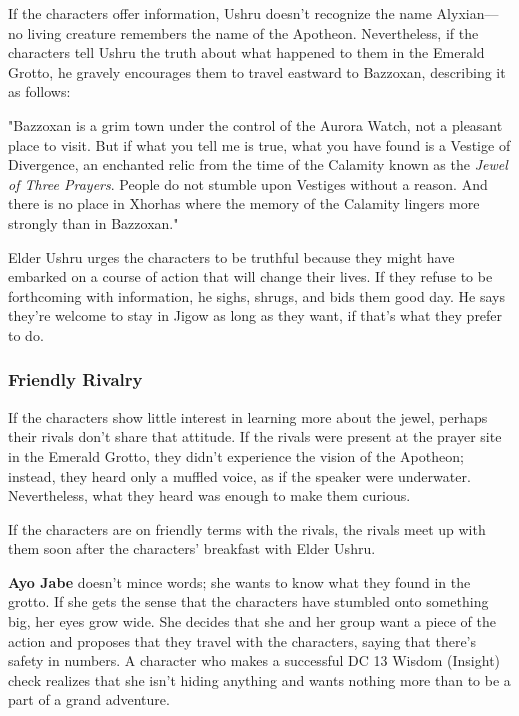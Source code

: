 \documentclass[a4paper, 11pt, bg=full, twocolumn, nooutline]{dndbook}
\begin{document}
If the characters offer information, Ushru doesn't recognize the name Alyxian---no living creature remembers the name of the Apotheon. Nevertheless, if the characters tell Ushru the truth about what happened to them in the Emerald Grotto, he gravely encourages them to travel eastward to Bazzoxan, describing it as follows:

\begin{DndReadAloud}
"Bazzoxan is a grim town under the control of the Aurora Watch, not a pleasant place to visit. But if what you tell me is true, what you have found is a Vestige of Divergence, an enchanted relic from the time of the Calamity known as the \textit{Jewel of Three Prayers}. People do not stumble upon Vestiges without a reason. And there is no place in Xhorhas where the memory of the Calamity lingers more strongly than in Bazzoxan."
\end{DndReadAloud}

Elder Ushru urges the characters to be truthful because they might have embarked on a course of action that will change their lives. If they refuse to be forthcoming with information, he sighs, shrugs, and bids them good day. He says they're welcome to stay in Jigow as long as they want, if that's what they prefer to do.

\subsubsection{Friendly Rivalry}

If the characters show little interest in learning more about the jewel, perhaps their rivals don't share that attitude. If the rivals were present at the prayer site in the Emerald Grotto, they didn't experience the vision of the Apotheon; instead, they heard only a muffled voice, as if the speaker were underwater. Nevertheless, what they heard was enough to make them curious.

If the characters are on friendly terms with the rivals, the rivals meet up with them soon after the characters' breakfast with Elder Ushru.

\textbf{Ayo Jabe} doesn't mince words; she wants to know what they found in the grotto. If she gets the sense that the characters have stumbled onto something big, her eyes grow wide. She decides that she and her group want a piece of the action and proposes that they travel with the characters, saying that there's safety in numbers. A character who makes a successful DC 13 Wisdom (Insight) check realizes that she isn't hiding anything and wants nothing more than to be a part of a grand adventure.
\end{document}
